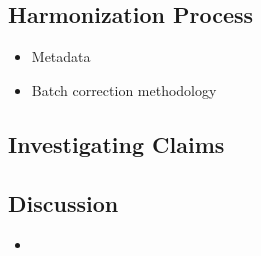 \documentclass[11pt,a4paper]{article}
\begin{document}
\subsection{Harmonization Process}
\begin{itemize}
    \item Metadata
    \item Batch correction methodology
\end{itemize}

\subsection{Investigating Claims}

\subsection{Discussion}
\begin{itemize}
    \item 
\end{itemize}
\end{document}
